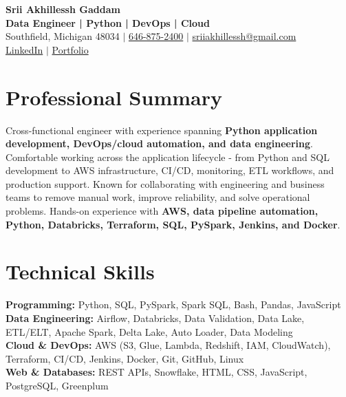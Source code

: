 \documentclass[letterpaper,10pt]{article}
\begin{document}
\fontsize{9.35pt}{10.45pt}\selectfont

\begin{center}
    {\LARGE \textbf{Srii Akhillessh Gaddam}} \\[-1pt]
    \textbf{Data Engineer | Python | DevOps | Cloud} \\[2pt]
    Southfield, Michigan 48034 $|$
    \href{tel:6468752400}{646-875-2400} $|$
    \href{mailto:sriiakhillessh@gmail.com}{sriiakhillessh@gmail.com} \\[1pt]
    \href{https://www.linkedin.com/in/srii-akhiilessh-gaddam-b48668191/}{LinkedIn} $|$
    \href{https://sriiakhillesshg.github.io/portfolio/}{Portfolio}
\end{center}
\vspace{-8pt}

\section{Professional Summary}
\small{Cross-functional engineer with experience spanning \textbf{Python application development, DevOps/cloud automation, and data engineering}. Comfortable working across the application lifecycle - from Python and SQL development to AWS infrastructure, CI/CD, monitoring, ETL workflows, and production support. Known for collaborating with engineering and business teams to remove manual work, improve reliability, and solve operational problems. Hands-on experience with \textbf{AWS, data pipeline automation, Python, Databricks, Terraform, SQL, PySpark, Jenkins, and Docker}.}

\section{Technical Skills}
\small{
\textbf{Programming:} Python, SQL, PySpark, Spark SQL, Bash, Pandas, JavaScript \\
\textbf{Data Engineering:} Airflow, Databricks, Data Validation, Data Lake, ETL/ELT, Apache Spark, Delta Lake, Auto Loader, Data Modeling \\
\textbf{Cloud \& DevOps:} AWS (S3, Glue, Lambda, Redshift, IAM, CloudWatch), Terraform, CI/CD, Jenkins, Docker, Git, GitHub, Linux \\
\textbf{Web \& Databases:} REST APIs, Snowflake, HTML, CSS, JavaScript, PostgreSQL, Greenplum
}
\end{document}
